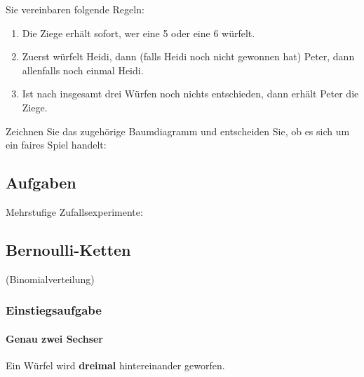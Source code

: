 Sie vereinbaren folgende Regeln:

\begin{enumerate}
\item Die Ziege erhält sofort, wer eine 5 oder eine 6 würfelt.
\item Zuerst würfelt Heidi, dann (falls Heidi noch nicht gewonnen hat) Peter, dann allenfalls noch einmal Heidi.
\item Ist nach insgesamt drei Würfen noch nichts entschieden, dann erhält Peter die Ziege.
\end{enumerate}


Zeichnen Sie das zugehörige Baumdiagramm und entscheiden Sie, ob es sich um ein faires Spiel handelt:



\subsection*{Aufgaben}

Mehrstufige Zufallsexperimente:

\newpage



\subsection{Bernoulli-Ketten}
(Binomialverteilung)


\subsubsection{Einstiegsaufgabe}

\paragraph{Genau zwei Sechser} Ein Würfel wird \textbf{dreimal} hintereinander geworfen.

